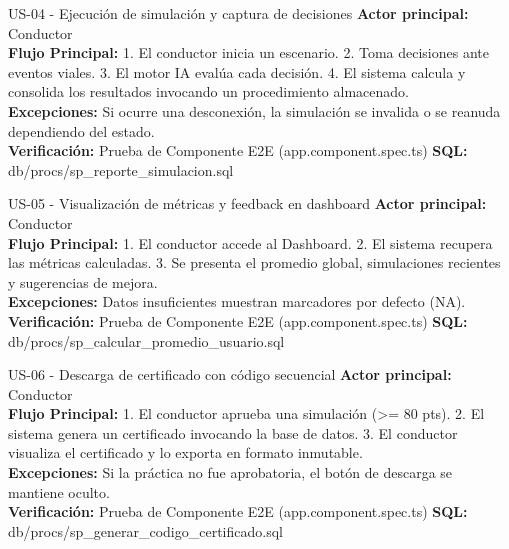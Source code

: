 \documentclass[11pt,a4paper]{article}
\begin{document}
\begin{requisito}{US-04 - Ejecución de simulación y captura de decisiones}
    \textbf{Actor principal:} Conductor\\[0.2cm]
    \textbf{Flujo Principal:} 1. El conductor inicia un escenario. 2. Toma decisiones ante eventos viales. 3. El motor IA evalúa cada decisión. 4. El sistema calcula y consolida los resultados invocando un procedimiento almacenado. \\[0.2cm]
    \textbf{Excepciones:} Si ocurre una desconexión, la simulación se invalida o se reanuda dependiendo del estado.\\[0.2cm]
    \textbf{Verificación:} Prueba de Componente E2E (app.component.spec.ts) \quad \textbf{SQL:} db/procs/sp\_reporte\_simulacion.sql
\end{requisito}

\begin{requisito}{US-05 - Visualización de métricas y feedback en dashboard}
    \textbf{Actor principal:} Conductor\\[0.2cm]
    \textbf{Flujo Principal:} 1. El conductor accede al Dashboard. 2. El sistema recupera las métricas calculadas. 3. Se presenta el promedio global, simulaciones recientes y sugerencias de mejora. \\[0.2cm]
    \textbf{Excepciones:} Datos insuficientes muestran marcadores por defecto (NA).\\[0.2cm]
    \textbf{Verificación:} Prueba de Componente E2E (app.component.spec.ts) \quad \textbf{SQL:} db/procs/sp\_calcular\_promedio\_usuario.sql
\end{requisito}

\begin{requisito}{US-06 - Descarga de certificado con código secuencial}
    \textbf{Actor principal:} Conductor\\[0.2cm]
    \textbf{Flujo Principal:} 1. El conductor aprueba una simulación (>= 80 pts). 2. El sistema genera un certificado invocando la base de datos. 3. El conductor visualiza el certificado y lo exporta en formato inmutable. \\[0.2cm]
    \textbf{Excepciones:} Si la práctica no fue aprobatoria, el botón de descarga se mantiene oculto.\\[0.2cm]
    \textbf{Verificación:} Prueba de Componente E2E (app.component.spec.ts) \quad \textbf{SQL:} db/procs/sp\_generar\_codigo\_certificado.sql
\end{requisito}

\newpage
\end{document}
